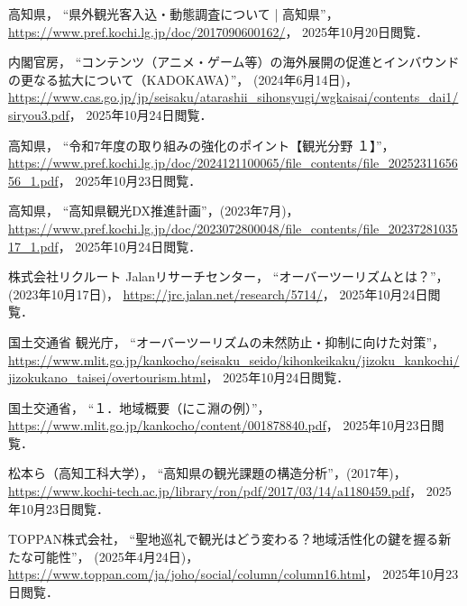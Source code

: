 \documentclass{docs}
\begin{document}
\begin{thebibliography}{99}
    高知県，
    “県外観光客入込・動態調査について | 高知県”，
    \url{https://www.pref.kochi.lg.jp/doc/2017090600162/}，
    2025年10月20日閲覧．

    内閣官房，
    “コンテンツ（アニメ・ゲーム等）の海外展開の促進とインバウンドの更なる拡大について（KADOKAWA）”，
    (2024年6月14日)，
    \url{https://www.cas.go.jp/jp/seisaku/atarashii_sihonsyugi/wgkaisai/contents_dai1/siryou3.pdf}，
    2025年10月24日閲覧．

    高知県，
    “令和7年度の取り組みの強化のポイント【観光分野 １】”，
    \url{https://www.pref.kochi.lg.jp/doc/2024121100065/file_contents/file_2025231165656_1.pdf}，
    2025年10月23日閲覧．

    高知県，
    “高知県観光DX推進計画”，(2023年7月)，
    \url{https://www.pref.kochi.lg.jp/doc/2023072800048/file_contents/file_2023728103517_1.pdf}，
    2025年10月24日閲覧．

    株式会社リクルート Jalanリサーチセンター，
    “オーバーツーリズムとは？”，(2023年10月17日)，
    \url{https://jrc.jalan.net/research/5714/}，
    2025年10月24日閲覧．

    国土交通省 観光庁，
    “オーバーツーリズムの未然防止・抑制に向けた対策”，
    \url{https://www.mlit.go.jp/kankocho/seisaku_seido/kihonkeikaku/jizoku_kankochi/jizokukano_taisei/overtourism.html}，
    2025年10月24日閲覧．

    国土交通省，
    “１．地域概要（にこ淵の例）”，
    \url{https://www.mlit.go.jp/kankocho/content/001878840.pdf}，
    2025年10月23日閲覧．

    松本ら（高知工科大学），
    “高知県の観光課題の構造分析”，(2017年)，
    \url{https://www.kochi-tech.ac.jp/library/ron/pdf/2017/03/14/a1180459.pdf}，
    2025年10月23日閲覧．

    TOPPAN株式会社，
    “聖地巡礼で観光はどう変わる？地域活性化の鍵を握る新たな可能性”，
    (2025年4月24日)，
    \url{https://www.toppan.com/ja/joho/social/column/column16.html}，
    2025年10月23日閲覧．


\end{thebibliography}
\end{document}
